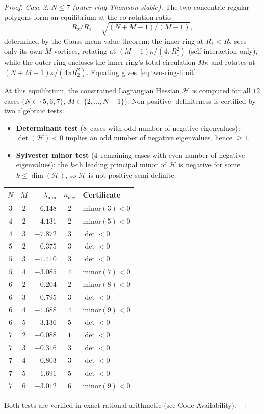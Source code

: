 \begin{proof}
\emph{Case 2: $N \le 7$ (outer ring Thomson-stable).}
The two concentric regular polygons form an equilibrium at the
co-rotation ratio
\begin{equation}\label{eq:two-ring-limit}
  R_2/R_1 = \sqrt{(N{+}M{-}1)/(M{-}1)},
\end{equation}
determined by the Gauss mean-value theorem: the inner ring at
$R_1 < R_2$ sees only its own $M$ vortices, rotating at
$(M{-}1)\kappa/(4\pi R_1^2)$ (self-interaction only), while
the outer ring encloses the inner ring's total circulation
$M\kappa$ and rotates at $(N{+}M{-}1)\kappa/(4\pi R_2^2)$.
Equating gives~\eqref{eq:two-ring-limit}.

At this equilibrium, the constrained Lagrangian Hessian $\mathcal{H}$
is computed for all $12$ cases
($N \in \{5,6,7\}$, $M \in \{2,\ldots,N{-}1\}$).  Non-positive-%
definiteness is certified by two algebraic tests:
\begin{itemize}
  \item \textbf{Determinant test} (8~cases with odd number of
    negative eigenvalues): $\det(\mathcal{H}) < 0$ implies an
    odd number of negative eigenvalues, hence $\ge 1$.
  \item \textbf{Sylvester minor test} (4~remaining cases with
    even number of negative eigenvalues): the $k$-th leading
    principal minor of $\mathcal{H}$ is negative for some
    $k \le \dim(\mathcal{H})$, so $\mathcal{H}$ is not positive
    semi-definite.
\end{itemize}
\begin{center}
\begin{tabular}{ccrcl}
\toprule
$N$ & $M$ & $\lambda_{\min}$ & $n_{\mathrm{neg}}$ & Certificate \\
\midrule
$3$ & $2$ & $-6.148$ & $2$ & minor$(3) < 0$ \\
$4$ & $2$ & $-4.131$ & $2$ & minor$(5) < 0$ \\
$4$ & $3$ & $-7.872$ & $3$ & $\det < 0$ \\
$5$ & $2$ & $-0.375$ & $3$ & $\det < 0$ \\
$5$ & $3$ & $-1.410$ & $3$ & $\det < 0$ \\
$5$ & $4$ & $-3.085$ & $4$ & minor$(7) < 0$ \\
$6$ & $2$ & $-0.204$ & $2$ & minor$(8) < 0$ \\
$6$ & $3$ & $-0.795$ & $3$ & $\det < 0$ \\
$6$ & $4$ & $-1.688$ & $4$ & minor$(9) < 0$ \\
$6$ & $5$ & $-3.136$ & $5$ & $\det < 0$ \\
$7$ & $2$ & $-0.088$ & $1$ & $\det < 0$ \\
$7$ & $3$ & $-0.316$ & $3$ & $\det < 0$ \\
$7$ & $4$ & $-0.803$ & $3$ & $\det < 0$ \\
$7$ & $5$ & $-1.691$ & $5$ & $\det < 0$ \\
$7$ & $6$ & $-3.012$ & $6$ & minor$(9) < 0$ \\
\bottomrule
\end{tabular}
\end{center}
Both tests are verified in exact rational arithmetic
(see Code Availability).


\end{proof}
